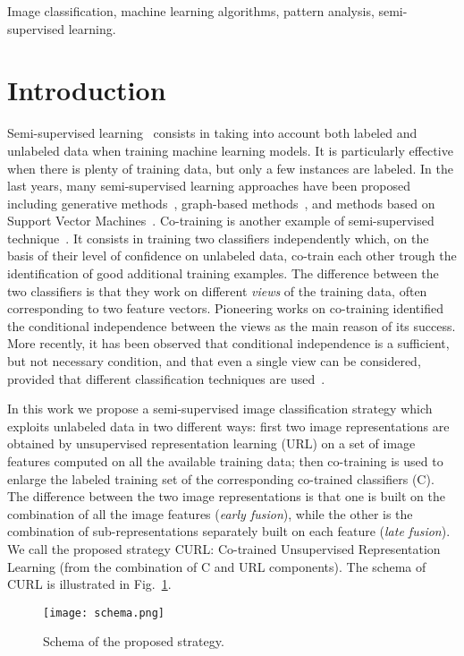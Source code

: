 \documentclass[journal,11pt]{IEEEtran}
\newcommand{\ADD}[1]{#1}
\newcommand{\coso}{strategy}
\begin{document}
\begin{IEEEkeywords}
Image classification, machine learning algorithms, pattern analysis, semi-supervised learning.
\end{IEEEkeywords}



\section{Introduction}
\label{sec:intro}

Semi-supervised learning~\cite{chapelle2006semi} consists in taking
into account both labeled and unlabeled data when training machine
learning models.  It is particularly effective when there is plenty of
training data, but only a few instances are labeled.  In the last
years, many semi-supervised learning approaches have been proposed
including generative methods~\cite{nigam2000text,fujino2005hybrid},
graph-based methods~\cite{blum2001learning,chapelle2002cluster}, and
methods based on Support Vector
Machines~\cite{joachims1999transductive,belkin2006manifold}.
Co-training is another example of semi-supervised
technique~\cite{blum1998combining}.  It consists in training two
classifiers independently which, on the basis of their level of
confidence on unlabeled data, co-train each other trough the
identification of good additional training examples.  The difference
between the two classifiers is that they work on different
\emph{views} of the training data, often corresponding to two feature
vectors.  Pioneering works on co-training identified the conditional
independence between the views as the main reason of its success.
More recently, it has been observed that conditional independence is a
sufficient, but not necessary condition, and that even a single view
can be considered, provided that different classification techniques
are used~\cite{zhou2010semi}.

In this work we propose a semi-supervised image classification
strategy which exploits unlabeled data in two different ways: first
two image representations are obtained by unsupervised representation learning \ADD{(URL)} on a
set of image features computed on all the available training data;
then co-training is used to enlarge the labeled training set of the
corresponding co-trained classifiers \ADD{(C)}.  The difference between the two image
representations is that one is built on the combination of all the
image features (\emph{early fusion}), while the other is the
combination of sub-representations separately built on each feature
(\emph{late fusion}).  \ADD{We call the proposed strategy CURL: Co-trained Unsupervised Representation Learning  (from the combination of C and URL components). The schema of CURL} is illustrated in
Fig.~\ref{fig:schema}.
%
\begin{figure}%
	\texttt{[image: schema.png]}%
  \caption{Schema of the proposed \coso.}%
  \label{fig:schema}%
\end{figure}
%
\end{document}
